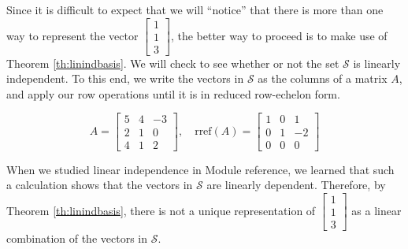 \documentclass{ximera}
\begin{document}
\begin{example}
\begin{explanation}
Since it is difficult to expect that we will ``notice'' that there is more than one way to represent the vector $\begin{bmatrix}1\\1\\3\end{bmatrix}$, the better way to proceed is to make use of Theorem \ref{th:linindbasis}.  We will check to see whether or not the set $\mathcal{S}$ is linearly independent.  To this end, we write the vectors in $\mathcal{S}$ as the columns of a matrix $A$, and apply our row operations until it is in reduced row-echelon form.

$$A=\left[\begin{array}{ccc}  
 5&4&-3\\2&1&0\\4&1&2
 \end{array}\right], \quad \mbox{rref}(A) = \left[\begin{array}{ccc}  
 1&0&1\\0&1&-2\\0&0&0
 \end{array}\right]
$$

When we studied linear independence in Module {\color{red} reference}, we learned that such a calculation shows that the vectors in $\mathcal{S}$ are linearly dependent.  Therefore, by Theorem \ref{th:linindbasis}, there is not a unique representation of $\begin{bmatrix}1\\1\\3\end{bmatrix}$ as a linear combination of the vectors in $\mathcal{S}$.



\end{explanation}
\end{example}
\end{document}
